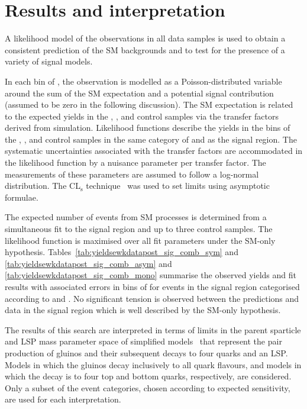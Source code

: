 \section{Results and interpretation}
\label{sec:interpretation}

A likelihood model of the observations in all data samples is
used to obtain a consistent prediction of the SM backgrounds and to
test for the presence of a variety of signal models.

In each bin of \scalht, the observation is modelled as a
Poisson-distributed variable around the sum of the SM expectation and a
potential signal contribution (assumed to be zero in the following
discussion). The SM expectation is related to the expected yields in
the \mj, \mmj, and \gj control samples via the transfer factors
derived from simulation. Likelihood functions describe the yields in the \scalht bins
of the \mj, \mmj, and \gj control samples in the same category of
\njet and \nb as the signal region. The systematic uncertainties
associated with the transfer factors are accommodated in the
likelihood function by a nuisance parameter per transfer factor. The
measurements of these parameters are assumed to follow a log-normal
distribution. The CL$_{\mathrm{s}}$ technique~\cite{read, Cowan:2010js} was used to set limits using asymptotic formulae.

The expected number of events from SM processes is determined from a
simultaneous fit to the signal region and up to three control
samples. The likelihood function is maximised over all fit parameters
under the SM-only hypothesis.
Tables~\ref{tab:yieldsewkdatapost_sig_comb_sym} and \ref{tab:yieldsewkdatapost_sig_comb_asym} and
\ref{tab:yieldsewkdatapost_sig_comb_mono} summarise
the observed yields and fit results with associated errors in bins of \scalht for events in the signal region
categorised according to \njet and \nb. 
No significant tension is observed between the predictions and data in the
signal region which is well described by the SM-only hypothesis.




\clearpage


The results of this search are interpreted in terms of limits in the
parent sparticle and LSP mass parameter space of simplified
models~\cite{Alwall:2008ag, Alwall:2008va, sms} that represent the pair production of gluinos and their subsequent decays to four quarks 
and an LSP. Models in which the gluinos decay inclusively to all quark flavours, and models in which the decay is to four top and bottom quarks, respectively, are considered. 
Only a subset of the event categories, chosen according to expected sensitivity, are used for
each interpretation. 

